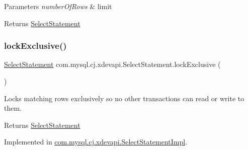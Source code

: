 \begin{DoxyParams}{Parameters}
{\em number\+Of\+Rows} & limit \\
\hline
\end{DoxyParams}
\begin{DoxyReturn}{Returns}
\mbox{\hyperlink{interfacecom_1_1mysql_1_1cj_1_1xdevapi_1_1_select_statement}{Select\+Statement}} 
\end{DoxyReturn}
\mbox{\label{interfacecom_1_1mysql_1_1cj_1_1xdevapi_1_1_select_statement_a86b185579eb689c07a5691ba33c59821}} 
\subsubsection{\texorpdfstring{lock\+Exclusive()}{lockExclusive()}\hspace{0.1cm}{\footnotesize\ttfamily [1/2]}}
{\footnotesize\ttfamily \mbox{\hyperlink{interfacecom_1_1mysql_1_1cj_1_1xdevapi_1_1_select_statement}{Select\+Statement}} com.\+mysql.\+cj.\+xdevapi.\+Select\+Statement.\+lock\+Exclusive (\begin{DoxyParamCaption}{ }\end{DoxyParamCaption})}

Locks matching rows exclusively so no other transactions can read or write to them.

\begin{DoxyReturn}{Returns}
\mbox{\hyperlink{interfacecom_1_1mysql_1_1cj_1_1xdevapi_1_1_select_statement}{Select\+Statement}} 
\end{DoxyReturn}


Implemented in \mbox{\hyperlink{classcom_1_1mysql_1_1cj_1_1xdevapi_1_1_select_statement_impl_a53aaa86b0305024bdd172a02e975b006}{com.\+mysql.\+cj.\+xdevapi.\+Select\+Statement\+Impl}}.

\mbox{\label{interfacecom_1_1mysql_1_1cj_1_1xdevapi_1_1_select_statement_a993dc3e6fa92a41a1ce2cb1aff9e7c4a}} 
